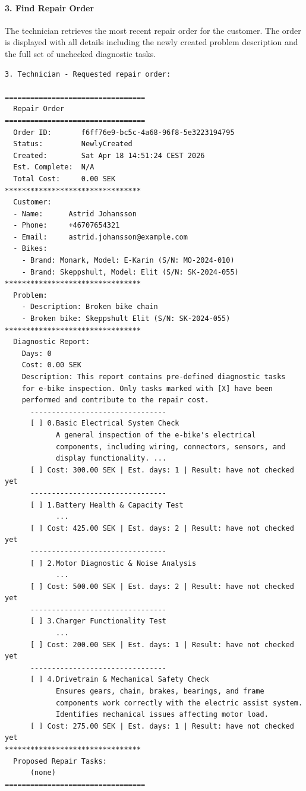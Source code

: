 \documentclass[a4paper]{scrartcl}
\begin{document}
\paragraph{3. Find Repair Order} 
The technician retrieves the most recent repair order for the customer. The order is displayed with all details including the newly created problem description and the full set of unchecked diagnostic tasks.

\begin{lstlisting}[style=outputstyle, caption={Printout from find repair order system operation}, label={fig:run-find-repair-order}]
3. Technician - Requested repair order:

=================================
  Repair Order
=================================
  Order ID:       f6ff76e9-bc5c-4a68-96f8-5e3223194795
  Status:         NewlyCreated
  Created:        Sat Apr 18 14:51:24 CEST 2026
  Est. Complete:  N/A
  Total Cost:     0.00 SEK
********************************
  Customer:
  - Name:      Astrid Johansson
  - Phone:     +46707654321
  - Email:     astrid.johansson@example.com
  - Bikes:
    - Brand: Monark, Model: E-Karin (S/N: MO-2024-010)
    - Brand: Skeppshult, Model: Elit (S/N: SK-2024-055)
********************************
  Problem:
    - Description: Broken bike chain
    - Broken bike: Skeppshult Elit (S/N: SK-2024-055)
********************************
  Diagnostic Report:
    Days: 0
    Cost: 0.00 SEK
    Description: This report contains pre-defined diagnostic tasks
    for e-bike inspection. Only tasks marked with [X] have been
    performed and contribute to the repair cost.
      --------------------------------
      [ ] 0.Basic Electrical System Check
            A general inspection of the e-bike's electrical
            components, including wiring, connectors, sensors, and
            display functionality. ...
      [ ] Cost: 300.00 SEK | Est. days: 1 | Result: have not checked yet
      --------------------------------
      [ ] 1.Battery Health & Capacity Test
            ...
      [ ] Cost: 425.00 SEK | Est. days: 2 | Result: have not checked yet
      --------------------------------
      [ ] 2.Motor Diagnostic & Noise Analysis
            ...
      [ ] Cost: 500.00 SEK | Est. days: 2 | Result: have not checked yet
      --------------------------------
      [ ] 3.Charger Functionality Test
            ...
      [ ] Cost: 200.00 SEK | Est. days: 1 | Result: have not checked yet
      --------------------------------
      [ ] 4.Drivetrain & Mechanical Safety Check
            Ensures gears, chain, brakes, bearings, and frame
            components work correctly with the electric assist system.
            Identifies mechanical issues affecting motor load.
      [ ] Cost: 275.00 SEK | Est. days: 1 | Result: have not checked yet
********************************
  Proposed Repair Tasks:
      (none)
=================================
\end{lstlisting}
\end{document}
